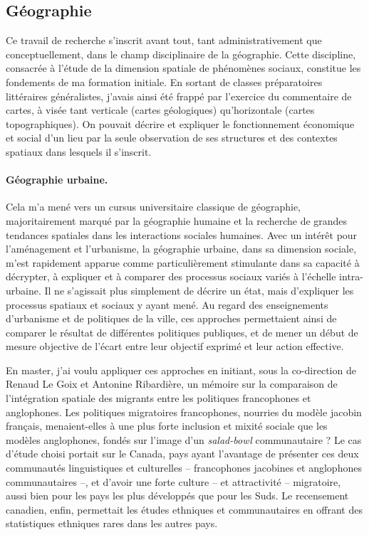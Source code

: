 \subsection{Géographie}

Ce travail de recherche s'inscrit avant tout, tant administrativement que conceptuellement, dans le champ disciplinaire de la géographie.
Cette discipline, consacrée à l'étude de la dimension spatiale de phénomènes sociaux, constitue les fondements de ma formation initiale.
En sortant de classes préparatoires littéraires généralistes, j'avais ainsi été frappé par l'exercice du commentaire de cartes, à visée tant verticale (cartes géologiques) qu'horizontale (cartes topographiques).
On pouvait décrire et expliquer le fonctionnement économique et social d'un lieu par la seule observation de ses structures et des contextes spatiaux dans lesquels il s'inscrit.

\paragraph{Géographie urbaine.}

Cela m'a mené vers un cursus universitaire classique de géographie, majoritairement marqué par la géographie humaine et la recherche de grandes tendances spatiales dans les interactions sociales humaines.
Avec un intérêt pour l'aménagement et l'urbanisme, la géographie urbaine, dans sa dimension sociale, m'est rapidement apparue comme particulièrement stimulante dans sa capacité à décrypter, à expliquer et à comparer des processus sociaux variés à l'échelle intra-urbaine.
Il ne s'agissait plus simplement de décrire un état, mais d'expliquer les processus spatiaux et sociaux y ayant mené.
Au regard des enseignements d'urbanisme et de politiques de la ville, ces approches permettaient ainsi de comparer le résultat de différentes politiques publiques, et de mener un début de mesure objective de l'écart entre leur objectif exprimé et leur action effective.

En master, j'ai voulu appliquer ces approches en initiant, sous la co-direction de Renaud Le Goix et Antonine Ribardière, un mémoire sur la comparaison de l'intégration spatiale des migrants entre les politiques francophones et anglophones.
Les politiques migratoires francophones, nourries du modèle jacobin français, menaient-elles à une plus forte inclusion et mixité sociale que les modèles anglophones, fondés sur l'image d'un \og \textit{salad-bowl}\fg{} communautaire ?
Le cas d'étude choisi portait sur le Canada, pays ayant l'avantage de présenter ces deux communautés linguistiques et culturelles -- francophones jacobines et anglophones communautaires --, et d'avoir une forte culture -- et attractivité -- migratoire, aussi bien pour les pays les plus développés que pour les Suds.
Le recensement canadien, enfin, permettait les études ethniques et communautaires en offrant des statistiques ethniques rares dans les autres pays.

